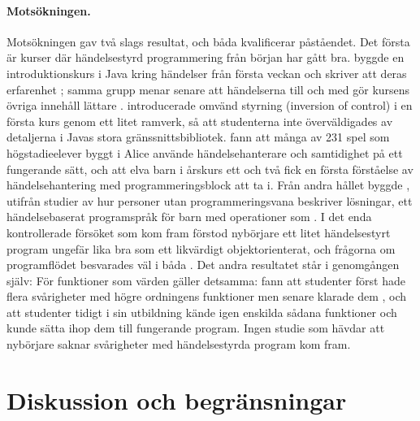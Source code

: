 \paragraph{Motsökningen.}  Motsökningen gav två slags resultat, och
båda kvalificerar påståendet.  Det första är kurser där händelsestyrd
programmering från början har gått bra.  \Textcite{BruceDanyluk2001}
byggde en introduktionskurs i Java kring händelser från första veckan
och skriver att deras erfarenhet ; samma grupp menar senare att
händelserna till och med gör kursens övriga innehåll lättare
\autocite{BruceDanyluk2004}.  \Textcite{ChristensenCaspersen2002}
introducerade omvänd styrning (\foreignlanguage{english}{inversion of
control}) i en första kurs genom ett litet ramverk, så att studenterna
inte överväldigades av detaljerna i Javas stora
gränssnittsbibliotek.  \Textcite{Werner2012} fann att många av 231
spel som högstadieelever byggt i Alice använde händelsehanterare och
samtidighet på ett fungerande sätt, och \textcite{Wang2016} att elva
barn i årskurs ett och två fick en första förståelse av
händelsehantering med programmeringsblock att ta i.  Från andra
hållet byggde \textcite{Pane2002}, utifrån studier av hur personer utan
programmeringsvana beskriver lösningar, ett händelsebaserat programspråk
för barn med operationer som .  I det enda
kontrollerade försöket som kom fram förstod nybörjare ett litet
händelsestyrt program ungefär lika bra som ett likvärdigt
objektorienterat, och frågorna om programflödet besvarades väl i båda
\autocite{KhazaeiJackson2002}.  Det andra resultatet står i
genomgången själv:   För funktioner
som värden gäller detsamma: \textcite{KrishnamurthiFisler2021} fann att
studenter först hade flera svårigheter med högre ordningens funktioner
men senare klarade dem , och \textcite{Rivera2022} att studenter tidigt i sin utbildning
kände igen enskilda sådana funktioner och kunde sätta ihop dem till
fungerande program.  Ingen studie som hävdar att nybörjare saknar
svårigheter med händelsestyrda program kom fram.

\section{Diskussion och begränsningar}
\label{sec:handelser-diskussion-grafik}


